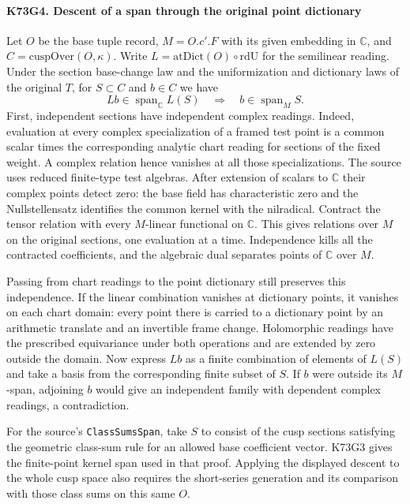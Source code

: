 \paragraph{K73G4. Descent of a span through the original point dictionary}
Let $O$ be the base tuple record, $M=O.c'.F$ with its given embedding
in $\mathbb C$, and $C=\mathrm{cuspOver}(O,\kappa)$. Write
$L=\mathrm{atDict}(O)\circ\mathrm{rdU}$ for the semilinear reading.
Under the section base-change law and the uniformization and dictionary
laws of the original $T$, for $S\subset C$ and $b\in C$ we have
\[
 Lb\in\operatorname{span}_{\mathbb C}L(S)
   \quad\Longrightarrow\quad b\in\operatorname{span}_M S .
\]
First, independent sections have independent complex readings.
Indeed, evaluation at every complex specialization of a framed test
point is a common scalar times the corresponding analytic chart
reading for sections of the fixed weight. A complex relation hence
vanishes at all those specializations. The source uses reduced
finite-type test algebras. After extension of scalars to $\mathbb C$
their complex points detect zero: the base field has characteristic
zero and the Nullstellensatz identifies the common kernel with the
nilradical. Contract the tensor relation with every $M$-linear
functional on $\mathbb C$. This gives relations over $M$ on
the original sections, one evaluation at a time. Independence kills
all the contracted coefficients, and the algebraic dual separates
points of $\mathbb C$ over $M$.

Passing from chart readings to the point dictionary still preserves
this independence. If the linear combination vanishes at dictionary
points, it vanishes on each chart domain: every point there is carried
to a dictionary point by an arithmetic translate and an invertible
frame change. Holomorphic readings have the prescribed equivariance
under both operations and are extended by zero outside the domain.
Now express $Lb$ as a finite combination of elements of $L(S)$ and
take a basis from the corresponding finite subset of $S$. If $b$
were outside its $M$-span, adjoining $b$ would give an independent
family with dependent complex readings, a contradiction.

For the source's \texttt{ClassSumsSpan}, take $S$ to consist of the
cusp sections satisfying the geometric class-sum rule for an allowed
base coefficient vector. K73G3 gives the finite-point kernel span used
in that proof. Applying the displayed descent to the whole cusp space
also requires the short-series generation and its comparison with
those class sums on this same $O$.
